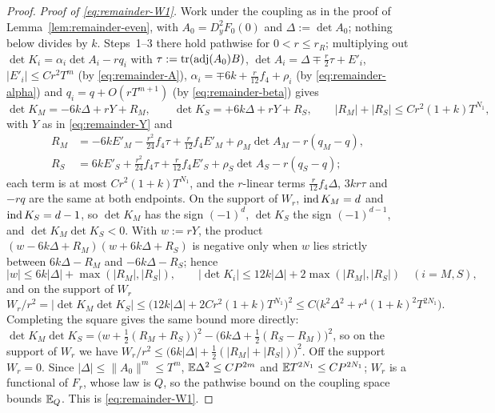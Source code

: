\begin{proof}
\emph{Proof of \eqref{eq:remainder-W1}.} Work under the coupling as in the proof of Lemma~\ref{lem:remainder-even}, with $A_0=D_y^2F_0(0)$ and $\Delta:=\det A_0$; nothing below divides by $k$. Steps~1--3 there hold pathwise for $0<r\le r_R$; multiplying out $\det K_i=\alpha_i\det A_i-rq_i$ with $\tau:=\operatorname{tr}(\operatorname{adj}(A_0)B)$, $\det A_i=\Delta\mp\tfrac r2\tau+E'_i$, $|E'_i|\le Cr^2T^m$ (by \eqref{eq:remainder-A}), $\alpha_i=\mp6k+\tfrac r{12}f_4+\rho_i$ (by \eqref{eq:remainder-alpha}) and $q_i=q+O(rT^{m+1})$ (by \eqref{eq:remainder-beta}) gives
\begin{equation}\label{eq:remainder-detK}
\det K_M=-6k\Delta+rY+R_M,\qquad \det K_S=+6k\Delta+rY+R_S,\qquad |R_M|+|R_S|\le Cr^2(1+k)T^{N_1},
\end{equation}
with $Y$ as in \eqref{eq:remainder-Y} and
\[
\begin{aligned}
R_{M}&=-6kE'_M-\tfrac{r^2}{24}f_4\tau+\tfrac r{12}f_4E'_M+\rho_M\det A_M-r(q_M-q),\\
R_{S}&=6kE'_S+\tfrac{r^2}{24}f_4\tau+\tfrac r{12}f_4E'_S+\rho_S\det A_S-r(q_S-q);
\end{aligned}
\]
each term is at most $Cr^2(1+k)T^{N_1}$, and the $r$-linear terms $\tfrac r{12}f_4\Delta$, $3kr\tau$ and $-rq$ are the same at both endpoints. On the support of $W_r$, $\operatorname{ind} K_M=d$ and $\operatorname{ind} K_S=d-1$, so $\det K_M$ has the sign $(-1)^d$, $\det K_S$ the sign $(-1)^{d-1}$, and $\det K_M\det K_S<0$. With $w:=rY$, the product $(w-6k\Delta+R_M)(w+6k\Delta+R_S)$ is negative only when $w$ lies strictly between $6k\Delta-R_M$ and $-6k\Delta-R_S$; hence
\[
|w|\le6k|\Delta|+\max(|R_M|,|R_S|),\qquad |\det K_i|\le12k|\Delta|+2\max(|R_M|,|R_S|)\quad(i=M,S),
\]
and on the support of $W_r$
\begin{equation}\label{eq:remainder-window}
W_r/r^2=|\det K_M\det K_S|\le\bigl(12k|\Delta|+2Cr^2(1+k)T^{N_1}\bigr)^2\le C\bigl(k^2\Delta^2+r^4(1+k)^2T^{2N_1}\bigr).
\end{equation}
Completing the square gives the same bound more directly: $\det K_M\det K_S=\bigl(w+\tfrac12(R_M+R_S)\bigr)^2-\bigl(6k\Delta+\tfrac12(R_S-R_M)\bigr)^2$, so on the support of $W_r$ we have $W_r/r^2\le\bigl(6k|\Delta|+\tfrac12(|R_M|+|R_S|)\bigr)^2$. Off the support $W_r=0$. Since $|\Delta|\le\|A_0\|^m\le T^m$, $\mathbb E\Delta^2\le CP^{2m}$ and $\mathbb E T^{2N_1}\le CP^{2N_1}$; $W_r$ is a functional of $F_r$, whose law is $Q$, so the pathwise bound on the coupling space bounds $\mathbb E_Q$. This is \eqref{eq:remainder-W1}.


\end{proof}
